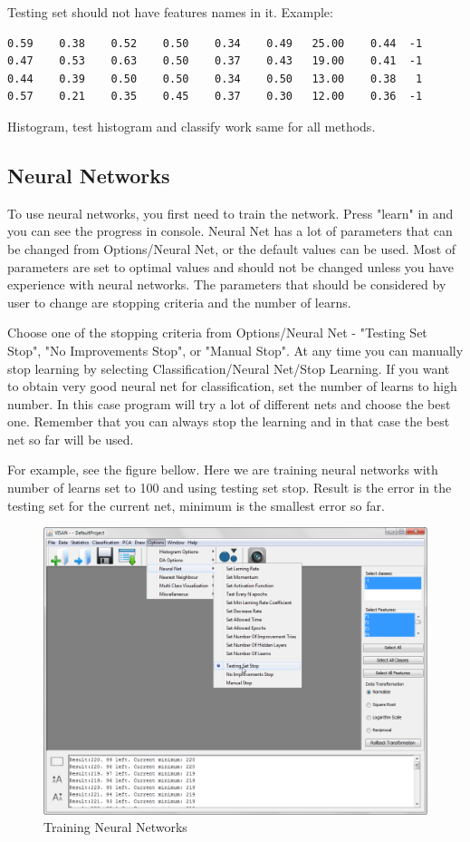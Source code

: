 \documentclass[a4paper,12pt,english]{report}
\begin{document}
Testing set should not have features names in it. Example:

\begin{lstlisting}
0.59    0.38    0.52    0.50    0.34    0.49   25.00    0.44  -1
0.47    0.53    0.63    0.50    0.37    0.43   19.00    0.41  -1
0.44    0.39    0.50    0.50    0.34    0.50   13.00    0.38   1
0.57    0.21    0.35    0.45    0.37    0.30   12.00    0.36  -1
\end{lstlisting}


Histogram, test histogram and classify work same for all methods.

\subsection*{Neural Networks}
To use neural networks, you first need to train the network. Press "learn" in and you can see the progress in console. Neural Net has a lot of parameters that can be changed from Options/Neural Net, or the default values can be used. Most of parameters are set to optimal values and should not be changed unless you have experience with neural networks. The parameters that should be considered by user to change are stopping criteria and the number of learns.

Choose one of the stopping criteria from Options/Neural Net - "Testing Set Stop", "No Improvements Stop", or "Manual Stop".  At any time you can manually stop learning by selecting Classification/Neural Net/Stop Learning. If you want to obtain very good neural net for classification, set the number of learns to high number. In this case program will try a lot of different nets and choose the best one. Remember that you can always stop the learning and in that case the best net so far will be used. 

For example, see the figure bellow. Here we are training neural networks with number of learns set to 100 and using testing set stop. Result is the error in the testing set for the current net, minimum is the smallest error so far. 


\begin{figure}[htb]
\centering
\includegraphics[width=360pt]{s13.png}
\caption{Training Neural Networks}
\end{figure}
\end{document}
